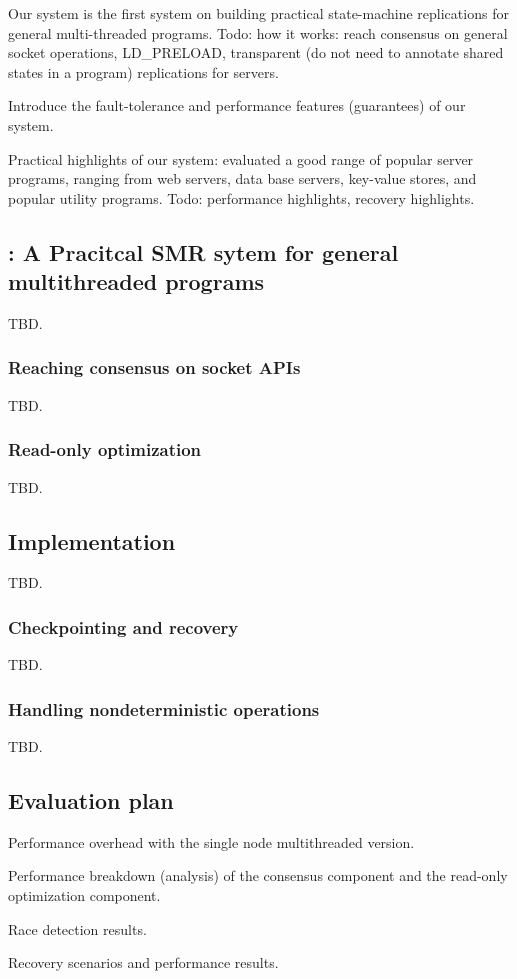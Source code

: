 Our system is the first system on building practical state-machine 
replications for general multi-threaded programs. Todo: how it works: reach 
consensus on general socket operations, LD\_PRELOAD, transparent (do not need 
to annotate shared states in a program) replications for servers.

Introduce the fault-tolerance and performance features (guarantees) of our 
system.

Practical highlights of our system: evaluated a good range of popular server 
programs, ranging from web servers, data base servers, key-value stores, and 
popular utility programs. Todo: performance highlights, recovery highlights.

\subsection{\msmr: A Pracitcal SMR sytem for general multithreaded programs} \label{sec:replication-msmr}
TBD.

\subsubsection{Reaching consensus on socket APIs} \label{sec:replication-msmr-consensus}
TBD.

\subsubsection{Read-only optimization} \label{sec:replication-msmr-readonly}
TBD.

\subsection{Implementation} \label{sec:replication-impl}
TBD.

\subsubsection{Checkpointing and recovery} \label{sec:replication-impl-checkpoint}
TBD.

\subsubsection{Handling nondeterministic operations} \label{sec:replication-impl-nondet}
TBD.

\subsection{Evaluation plan} \label{sec:replication-eval}
Performance overhead with the single node multithreaded version.

Performance breakdown (analysis) of the consensus component and the read-only optimization component.

Race detection results.

Recovery scenarios and performance results.



